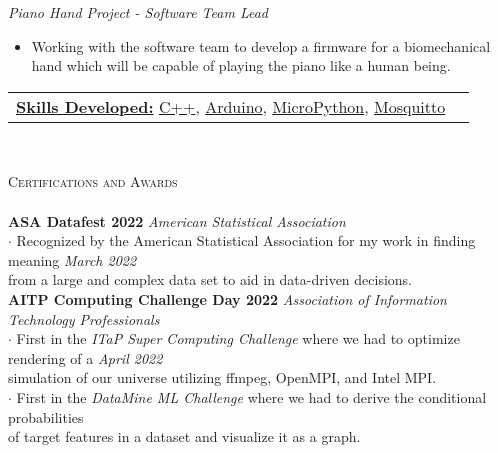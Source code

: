 \documentclass[a4paper]{article}
\newcommand{\lineunder} {
    \vspace*{-8pt} \\
    \hspace*{-18pt} \hrulefill \\
}
\newcommand{\header} [1] {
    {\hspace*{-18pt}\vspace*{6pt} \textsc{#1}}
    \vspace*{-6pt} \lineunder
}
\begin{document}
\vspace{2mm}
\textit{Piano Hand Project - Software Team Lead}
\begin{itemize} \itemsep 1pt
    \item Working with the software team to develop a firmware for a biomechanical hand which will be capable of playing the piano like a human being.
\end{itemize}
\begin{tabular}{ l l }
    \underline{\textbf {Skills Developed:}} \href{https://cplusplus.com/}{C++}, \href{https://www.arduino.cc/}{Arduino}, \href{https://micropython.org/}{MicroPython}, \href{https://mosquitto.org/}{Mosquitto}
\end{tabular} \\
\vspace*{2mm}

\header{Certifications and Awards}
\textbf{ASA Datafest 2022} \hfill \textit{American Statistical Association}\\
\vspace {1mm}
$\cdot$ Recognized by the American Statistical Association for my work in finding meaning \hfill \textit {March 2022}\\ from a large and complex data set to aid in data-driven decisions. \\
\vspace{2mm}
\textbf{AITP Computing Challenge Day 2022} \hfill \textit{Association of Information Technology Professionals}\\
\vspace {1mm}
$\cdot$ First in the \textit{ITaP Super Computing Challenge} where we had to optimize rendering of a \hfill \textit {April 2022}\\ simulation of our universe utilizing ffmpeg, OpenMPI, and Intel MPI. 
\vspace{2mm}\\
$\cdot$ First in the \textit{DataMine ML Challenge} where we had to derive the conditional probabilities\\ of target features in a dataset and visualize it as a graph.
\vspace*{6.94mm}
\end{document}

